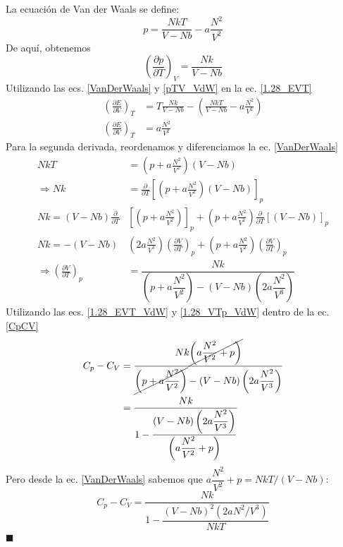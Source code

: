 \documentclass[]{article}
\numberwithin{equation}{section}
\newcommand{\0}{\textcolor{gray}{0}}
\newcommand{\deriv}[3]{\left(\frac{\partial #1}{\partial #2} \right)_{#3}}
\newcommand{\qed}{\hfill\(\blacksquare\)}
\begin{document}
La ecuación de Van der Waals se define:
\begin{equation}
	p = \frac{N k T}{V - N b} - a\frac{N^2}{V^2}\label{VanDerWaals}
\end{equation}
De aquí, obtenemos
\begin{equation}
	\deriv{p}{T}{V} = \frac{N k}{V - N b}\label{pTV_VdW}
\end{equation}
Utilizando las ecs. \ref{VanDerWaals} y \ref{pTV_VdW} en la ec. \ref{1.28_EVT}
\begin{align}
	\deriv{E}{V}{T} &= T \frac{N k}{V - N b} - \left( \frac{N k T}{V - N b} - a\frac{N^2}{V^2}\right) \nonumber\\
	\deriv{E}{V}{T} &= a\frac{N^2}{V^2} \label{1.28_EVT_VdW}
\end{align}
Para la segunda derivada, reordenamos y diferenciamos la ec. \ref{VanDerWaals}
\begin{align}
	N k T &= \left( p + a\frac{N^2}{V^2}\right) \left( V - N b\right)\nonumber \\
	\Rightarrow N k &= \frac{\partial}{\partial T}\left[\left( p + a\frac{N^2}{V^2}\right) \left( V - N b\right) \right]_p\nonumber\\
	N k = \left( V - N b\right)\frac{\partial}{\partial T}&\left[\left( p + a\frac{N^2}{V^2}\right)\right]_p + \left( p + a\frac{N^2}{V^2}\right)\frac{\partial}{\partial T}\left[\left( V - N b\right) \right]_p \nonumber\\
	N k = - \left( V - N b\right)&\left(2a \frac{N^2}{V^3}\right)\deriv{V}{T}{p} + \left( p + a\frac{N^2}{V^2}\right)\deriv{V}{T}{p}\nonumber\\
	\Rightarrow \deriv{V}{T}{p} &= \dfrac{N k}{\left( p + a\dfrac{N^2}{V^2}\right) - \left( V - N b\right) \left(2a \dfrac{N^2}{V^3}\right) } \label{1.28_VTp_VdW}
\end{align}
Utilizando las ecs. \ref{1.28_EVT_VdW} y \ref{1.28_VTp_VdW} dentro de la ec. \ref{CpCV}
\begin{align*}
	C_p - C_V &= \dfrac{N k \cancel{\left(a\dfrac{N^2}{V^2} + p\right)} }{\cancel{\left( p + a\dfrac{N^2}{V^2}\right)} - \left( V - N b\right) \left(2a \dfrac{N^2}{V^3}\right) }\\
	&= \dfrac{N k}{1 - \dfrac{\left( V - N b\right) \left(2a \dfrac{N^2}{V^3}\right)}{\left(a\dfrac{N^2}{V^2} + p\right)}}
\end{align*}
Pero desde la ec. \ref{VanDerWaals} sabemos que \(a\dfrac{N^2}{V^2} + p = NkT/(V - Nb)\):
\begin{equation}
	C_p - C_V = \dfrac{N k}{1 - \dfrac{\left( V - N b\right)^2 \left(2a N^2/V^3\right)}{NkT}}
\end{equation}
\qed
\end{document}
